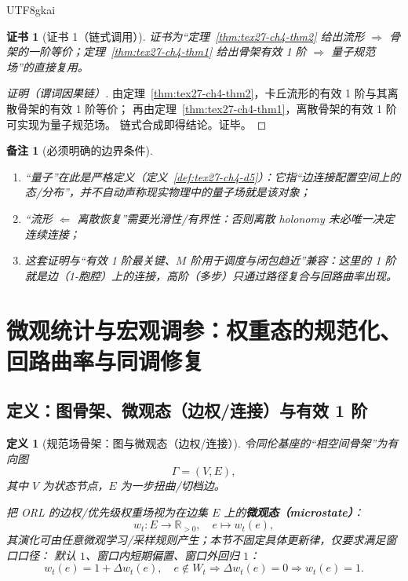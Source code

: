 \documentclass[12pt]{article}
\newtheorem{definition}{定义}[section]
\newtheorem{remark}{备注}[section]
\newtheorem{Certificate}{证书}[section]
\newcommand{\RR}{\mathbb{R}}
\begin{document}
\begin{CJK*}{UTF8}{gkai}
\begin{Certificate}[证书 1（链式调用）]
\label{cert:tex27-ch4-cor1}
证书为“定理~\ref{thm:tex27-ch4-thm2} 给出流形 $\Rightarrow$ 骨架的一阶等价；定理~\ref{thm:tex27-ch4-thm1} 给出骨架有效 1 阶 $\Rightarrow$
  量子规范场”的直接复用。
\end{Certificate}

\begin{proof}[证明（谓词因果链）]
由定理~\ref{thm:tex27-ch4-thm2}，卡丘流形的有效 1 阶与其离散骨架的有效 1 阶等价；
再由定理~\ref{thm:tex27-ch4-thm1}，离散骨架的有效 1 阶可实现为量子规范场。
链式合成即得结论。证毕。
\end{proof}

\begin{remark}[必须明确的边界条件]
\begin{enumerate}
  \item “量子”在此是严格定义（定义~\ref{def:tex27-ch4-d5}）：它指“边连接配置空间上的态/分布”，并不自动声称现实物理中的量子场就是该对象；
  \item “流形 $\Leftarrow$ 离散恢复”需要光滑性/有界性：否则离散 holonomy 未必唯一决定连续连接；
  \item 这套证明与“有效 1 阶最关键、$M$ 阶用于调度与闭包趋近”兼容：这里的 1 阶就是边（1-胞腔）上的连接，高阶（多步）只通过路径复合与回路曲率出现。
\end{enumerate}
\end{remark}

\clearpage

\section{微观统计与宏观调参：权重态的规范化、回路曲率与同调修复}
\label{sec:tex27-ch5-orl-gauge}

\subsection{定义：图骨架、微观态（边权/连接）与有效 1 阶}
\label{subsec:tex27-ch5-defs}

\begin{definition}[规范场骨架：图与微观态（边权/连接）]
\label{def:tex27-ch5-d1}
令同伦基座的“相空间骨架”为有向图
\[
  \Gamma=(V,E),
\]
其中 $V$ 为状态节点，$E$ 为一步扭曲/切档边。

把 ORL 的边权/优先级权重场视为在边集 $E$ 上的\textbf{微观态（microstate）}：
\[
  w_t:E\to\RR_{>0},\quad e\mapsto w_t(e),
\]
其演化可由任意微观学习/采样规则产生；本节不固定具体更新律，仅要求满足窗口口径：
默认 $1$、窗口内短期偏置、窗口外回归 $1$：
\[
  w_t(e)=1+\Delta w_t(e),\quad e\notin W_t\Rightarrow \Delta w_t(e)=0\Rightarrow w_t(e)=1.
\]
\end{definition}


\end{CJK*}
\end{document}
